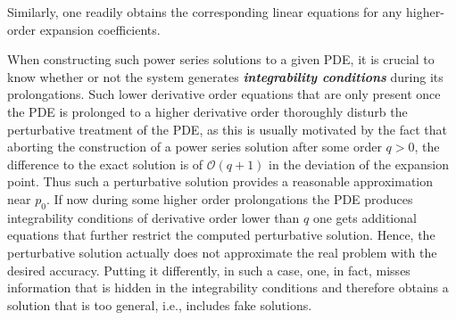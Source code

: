 \documentclass[%
 reprint,
nofootinbib,
 amsmath,amssymb,
 aps,
 prd,
floatfix,
]{revtex4-2}
\begin{document}
Similarly, one readily obtains the corresponding linear equations for any higher-order expansion coefficients. 

When constructing such power series solutions to a given PDE, it is crucial to know whether or not the system generates \textit{\textbf{integrability conditions}} during its prolongations. Such lower derivative order equations that are only present once the PDE is prolonged to a higher derivative order thoroughly disturb the perturbative treatment of the PDE, as this is usually motivated by the fact that aborting the construction of a power series solution
after some order $q>0$, the difference to the exact solution is of $\mathcal{O}(q+1)$ in the deviation of the expansion point. Thus such a perturbative solution provides a reasonable approximation near $p_0$. 
If now during some higher order prolongations the PDE produces integrability conditions of derivative order lower than $q$ one gets additional equations that further restrict the computed perturbative solution. 
Hence, the perturbative solution actually does not approximate the real problem with the desired accuracy. Putting it differently, in such a case, one, in fact, misses information that is hidden in the integrability conditions and therefore obtains a solution that is too general, i.e., includes fake solutions. 
\end{document}
